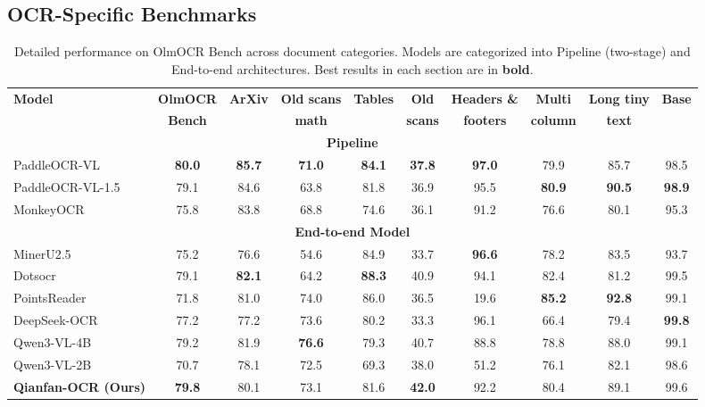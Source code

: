 \documentclass[dvipsnames]{article}
\begin{document}
\subsection{OCR-Specific Benchmarks}

\begin{table}[htbp]
\centering
\small
\setlength{\tabcolsep}{4pt}
\begin{tabular}{l|c|cccccccc}
\toprule
\textbf{Model} & \textbf{OlmOCR} & \textbf{ArXiv} & \textbf{Old scans} & \textbf{Tables} & \textbf{Old} & \textbf{Headers \&} & \textbf{Multi} & \textbf{Long tiny} & \textbf{Base} \\
 & \textbf{Bench} & & \textbf{math} & & \textbf{scans} & \textbf{footers} & \textbf{column} & \textbf{text} & \\
\midrule
\multicolumn{10}{c}{\textbf{Pipeline}} \\
\midrule
PaddleOCR-VL & \textbf{80.0} & \textbf{85.7} & \textbf{71.0} & \textbf{84.1} & \textbf{37.8} & \textbf{97.0} & 79.9 & 85.7 & 98.5 \\
PaddleOCR-VL-1.5 & 79.1 & 84.6 & 63.8 & 81.8 & 36.9 & 95.5 & \textbf{80.9} & \textbf{90.5} & \textbf{98.9} \\
MonkeyOCR & 75.8 & 83.8 & 68.8 & 74.6 & 36.1 & 91.2 & 76.6 & 80.1 & 95.3 \\
\midrule
\multicolumn{10}{c}{\textbf{End-to-end Model}} \\
\midrule
MinerU2.5 & 75.2 & 76.6 & 54.6 & 84.9 & 33.7 & \textbf{96.6} & 78.2 & 83.5 & 93.7 \\
Dotsocr & 79.1 & \textbf{82.1} & 64.2 & \textbf{88.3} & 40.9 & 94.1 & 82.4 & 81.2 & 99.5 \\
PointsReader & 71.8 & 81.0 & 74.0 & 86.0 & 36.5 & 19.6 & \textbf{85.2} & \textbf{92.8} & 99.1 \\
DeepSeek-OCR & 77.2 & 77.2 & 73.6 & 80.2 & 33.3 & 96.1 & 66.4 & 79.4 & \textbf{99.8} \\
Qwen3-VL-4B & 79.2 & 81.9 & \textbf{76.6} & 79.3 & 40.7 & 88.8 & 78.8 & 88.0 & 99.1 \\
Qwen3-VL-2B & 70.7 & 78.1 & 72.5 & 69.3 & 38.0 & 51.2 & 76.1 & 82.1 & 98.6 \\
\textbf{Qianfan-OCR (Ours)} & \textbf{79.8} & 80.1 & 73.1 & 81.6 & \textbf{42.0} & 92.2 & 80.4 & 89.1 & 99.6 \\
\bottomrule
\end{tabular}
\caption{Detailed performance on OlmOCR Bench across document categories. Models are categorized into Pipeline (two-stage) and End-to-end architectures. Best results in each section are in \textbf{bold}.}
\label{tab:ocr_specific}
\end{table}
\end{document}
